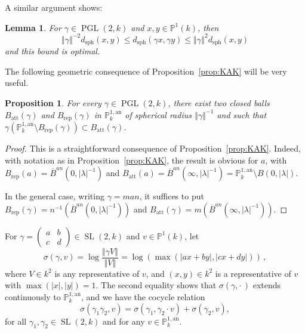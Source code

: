 \documentclass[11pt]{article}
\newtheorem{lemm}[theo]{Lemma}
\newtheorem{prop}[theo]{Proposition}
\theoremstyle{definition}
\numberwithin{equation}{section}
\numberwithin{figure}{section}
\numberwithin{table}{section}
\DeclareMathOperator{\sph}{sph}
\DeclareMathOperator{\SL}{SL}
\DeclareMathOperator{\PGL}{PGL}
\newcommand{\pp}{\mathbb{P}}
\newcommand{\an}{\mathrm{an}}
\newcommand{\norm}[1]{\left\Vert#1\right\Vert}
\newcommand{\abs}[1]{\left\vert#1\right\vert}
\newcommand{\PP}{\mathbb{P}}
\newcommand{\berk}{{\mathbb{P}^{1, \mathrm{an}}_k}}
\newcommand{\lrpar}[1]{\left(#1\right)}
\newcommand{\la}{\lambda}
\newcommand{\att}{\mathrm{att}}
\newcommand{\rep}{\mathrm{rep}}
\newcommand{\SLk}{\SL(2,k)}
\newcommand{\PGLk}{\PGL(2, k)}
\newcommand{\inv}{^{-1}}
\begin{document}
A similar argument shows:

\begin{lemm}\label{lem:lipschitz}
For $\gamma\in \PGLk$ and $x, y\in \PP^1(k)$, then
\[
\norm{\gamma}^{-2} d_{\sph}(x, y)\leq d_{\sph}(\gamma x, \gamma y)\leq
\norm{\gamma}^{2} d_\mathrm{sph}(x, y)
\]
and this bound is optimal.
\end{lemm}

The following geometric consequence of Proposition~\ref{prop:KAK} will be very useful.

\begin{prop}\label{prop:B att rep}
For every $\gamma\in \PGLk$, there exist two closed balls $B_\att(\gamma)$ and $B_\rep(\gamma)$ in $\PP^{1,\an}_k$ of spherical radius $\norm{\gamma}\inv$ and such that $\gamma(\PP^{1,\an}_k\setminus B_\rep(\gamma))\subset B_\att(\gamma)$.
\end{prop}

\begin{proof}
This is a straightforward consequence of Proposition~\ref{prop:KAK}. Indeed, with notation as in Proposition~\ref{prop:KAK}, the result is obvious for $a$, with $B_\rep(a) = \overline{B}^{an}(0, \abs{\la}\inv)$ and $B_\att(a) = \overline{B}^{an}(\infty, \abs{\la}\inv) = \pp^{1,\an}_k\setminus B(0, \abs{\la})$.

In the general case, writing $\gamma =man$, it suffices to put $B_{\rep}(\gamma) = n\inv (\overline{B}^{an}(0, \abs{\lambda}\inv))$ and $B_{\att}(\gamma) = m (\overline{B}^{an}(\infty, \abs{\lambda}\inv))$.
\end{proof}

For $\gamma = \lrpar{
\begin{smallmatrix} a & b \\ c & d
\end{smallmatrix}} \in \SLk$ and $v\in \pp^1(k)$, let
\begin{equation}\label{eq:sigma1}
\sigma(\gamma,v) = \log\frac{\norm{\gamma V}}{\norm{V}} =\log \lrpar{\max (\abs{ax+by}, \abs{cx+dy}) }\,,
\end{equation}
where $V\in k^2$ is any representative of $v$, and $(x,y)\in k^2$ is a representative of $v$ with $\max (\abs{x}, \abs{y})=1$. The second equality shows that $\sigma(\gamma,{\cdot\,})$ extends continuously to $\berk$, and we have the cocycle relation
\begin{equation}\label{eq:cocycle}
\sigma(\gamma_1 \gamma_2,v) = \sigma(\gamma_1, \gamma_2 \cdot v) + \sigma(\gamma_2, v),
\end{equation}
for all $\gamma_1, \gamma_2 \in \SL(2,k)$ and for any $v\in \PP^{1,\an}_k$.
\end{document}
